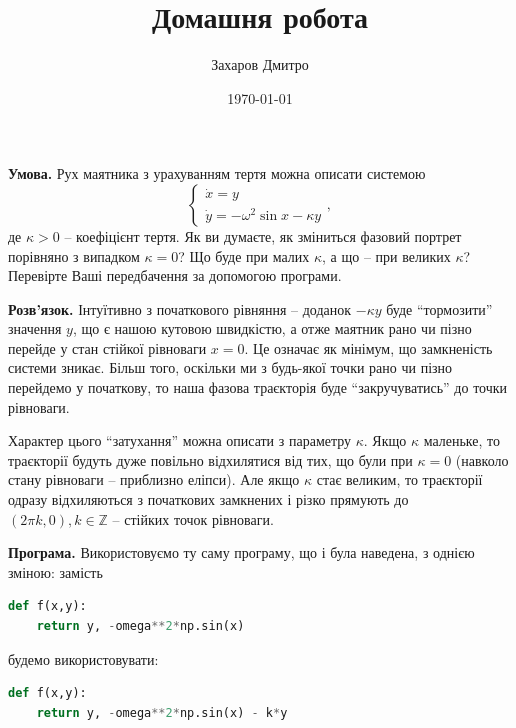 \documentclass[oneside,solution]{tmpl}
\title{Домашня робота}
\author{Захаров Дмитро}
\date{\today}
\begin{document}
\maketitle



\textbf{Умова.} Рух маятника з урахуванням тертя можна описати системою
\begin{equation*}
    \begin{cases}
        \dot{x} = y \\
        \dot{y} = -\omega^2 \sin x - \kappa y
    \end{cases},
\end{equation*}
де $\kappa>0$ -- коефіцієнт тертя. Як ви думаєте, як зміниться фазовий портрет порівняно з випадком $\kappa=0$? Що буде при малих $\kappa$, а що -- при великих $\kappa$? Перевірте Ваші передбачення за допомогою програми. 

\textbf{Розв'язок.} Інтуїтивно з початкового рівняння -- доданок $-\kappa y$ буде ``тормозити'' значення $y$, що є нашою кутовою швидкістю, а отже маятник рано чи пізно перейде у стан стійкої рівноваги $x=0$. Це означає як мінімум, що замкненість системи зникає. Більш того, оскільки ми з будь-якої точки рано чи пізно перейдемо у початкову, то наша фазова траєкторія буде ``закручуватись'' до точки рівноваги.

Характер цього ``затухання'' можна описати з параметру $\kappa$. Якщо $\kappa$ маленьке, то траєкторії будуть дуже повільно відхилятися від тих, що були при $\kappa=0$ (навколо стану рівноваги -- приблизно еліпси). Але якщо $\kappa$ стає великим, то траєкторії одразу відхиляються з початкових замкнених і різко прямують до $(2\pi k,0), k \in \mathbb{Z}$ -- стійких точок рівноваги. 

\textbf{Програма.} Використовуємо ту саму програму, що і була наведена, з однією зміною: замість
\begin{lstlisting}[language=Python]
def f(x,y):
    return y, -omega**2*np.sin(x) 
\end{lstlisting}
будемо використовувати:
\begin{lstlisting}[language=Python]
def f(x,y):
    return y, -omega**2*np.sin(x) - k*y
\end{lstlisting}
\end{document}
